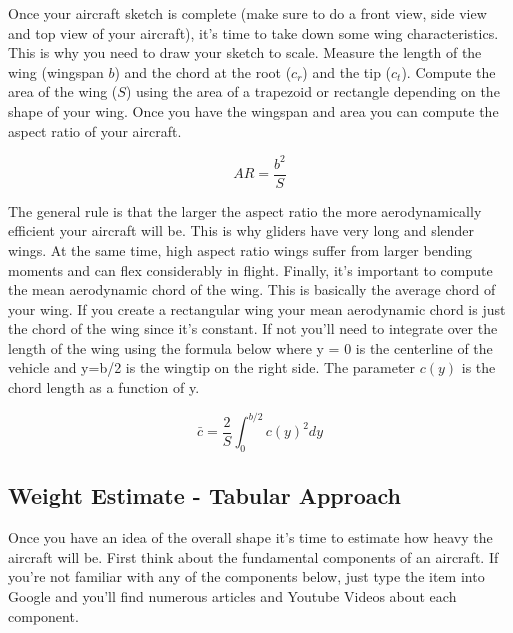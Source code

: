 Once your aircraft sketch is complete (make sure to do a front view,
side view and top view of your aircraft), it's time to take down some
wing characteristics. This is why you need to draw your sketch to
scale. Measure the length of the wing (wingspan $b$) and the chord at the
root ($c_r$) and the tip ($c_t$). Compute the area of the wing ($S$) using
the area of a trapezoid or rectangle depending on the shape of your
wing. Once you have the wingspan and area you can compute the aspect
ratio of your aircraft.

\begin{equation}
AR = \frac{b^2}{S}
\end{equation}

The general rule is that the larger the aspect ratio the more
aerodynamically efficient your aircraft will be. This is why gliders
have very long and slender wings. At the same time, high aspect ratio
wings suffer from larger bending moments and can flex considerably in
flight. Finally, it's important to compute the mean aerodynamic chord
of the wing. This is basically the average chord of your wing. If you
create a rectangular wing your mean aerodynamic chord is just the
chord of the wing since it's constant. If not you'll need to integrate
over the length of the wing using the formula below where y = 0 is the
centerline of the vehicle and y=b/2 is the wingtip on the right
side\cite{caughey}. The parameter $c(y)$ is the chord length as a
function of y.

\begin{equation}
\bar{c} = \frac{2}{S}\int^{b/2}_0 c(y)^2 dy
\end{equation}

\subsection{Weight Estimate - Tabular Approach}

Once you have an idea of the overall shape it's time to estimate how
heavy the aircraft will be. First think about the fundamental
components of an aircraft. If you're not familiar with any of the
components below, just type the item into Google and you'll find
numerous articles and Youtube Videos about each component.

